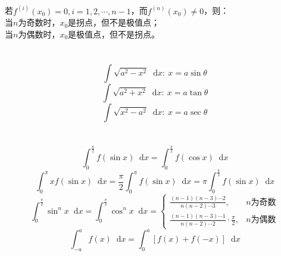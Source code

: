 \documentclass[]{article}
\newcommand*{\dif}{\mathop{}\!\mathrm{d}}
\numberwithin{equation}{section}
\begin{document}
\section{}
若$f^{(i)}(x_0)=0,i=1,2,\cdots,n-1$，而$f^{(n)}(x_0)\neq0$，则：\\
当$n$为奇数时，$x_0$是拐点，但不是极值点；\\
当$n$为偶数时，$x_0$是极值点，但不是拐点。

\section{}
\begin{equation}
    \int\sqrt{a^2-x^2}\dif x:\ x=a\sin\theta
\end{equation}
\begin{equation}
    \int\sqrt{a^2+x^2}\dif x:\ x=a\tan\theta
\end{equation}
\begin{equation}
    \int\sqrt{x^2-a^2}\dif x:\ x=a\sec\theta
\end{equation}

\section{}
\begin{equation}
    \int_0^\frac{\pi}{2}f(\sin x)\dif x=\int_0^\frac{\pi}{2}f(\cos x)\dif x
\end{equation}
\begin{equation}
    \int_0^\pi xf(\sin x)\dif x=\frac{\pi}{2}\int_0^\pi f(\sin x)\dif x=\pi\int_0^\frac{\pi}{2}f(\sin x)\dif x
\end{equation}
\begin{equation}
    \int_0^\frac{\pi}{2}\sin^n x\dif x=\int_0^\frac{\pi}{2}\cos^n x\dif x=
    \begin{cases}
        \frac{(n-1)(n-3)\cdots2}{n(n-2)\cdots3},                   & n\text{为奇数} \\
        \frac{(n-1)(n-3)\cdots1}{n(n-2)\cdots2}\cdot\frac{\pi}{2}, & n\text{为偶数}
    \end{cases}
\end{equation}
\begin{equation}
    \int_{-a}^a f(x)\dif x=\int_0^a[f(x)+f(-x)]\dif x
\end{equation}
\end{document}

